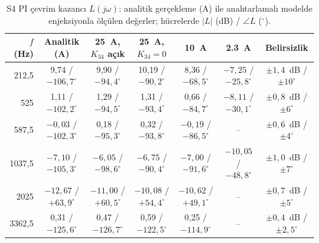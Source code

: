 \begin{table}[htbp]
  \centering
  \caption{S4 PI çevrim kazancı $L(j\omega)$: analitik gerçekleme (A) ile anahtarlamalı modelde enjeksiyonla ölçülen değerler; hücrelerde $|L|$ (dB) / $\angle L$ ($^{\circ}$).}
  \label{tab:kararlilik-olcum}
  \scriptsize
  \setlength{\tabcolsep}{3pt}
  \begin{tabular}{@{}r c c c c c c@{}}
    \toprule
    $f$ (Hz) & Analitik (A) & \SI{25}{\ampere}, $K_{34}$ açık & \SI{25}{\ampere}, $K_{34}=0$ & \SI{10}{\ampere} & \SI{2.3}{\ampere} & Belirsizlik \\
    \midrule
    212,5  & 9,74 / $-106{,}7^{\circ}$ & 9,90 / $-94{,}4^{\circ}$ & 10,19 / $-90{,}2^{\circ}$ & 8,36 / $-68{,}5^{\circ}$ & $-7{,}25$ / $-25{,}8^{\circ}$ & $\pm1{,}4$~dB / $\pm10^{\circ}$ \\
    525    & 1,11 / $-102{,}2^{\circ}$ & 1,29 / $-94{,}5^{\circ}$ & 1,31 / $-93{,}4^{\circ}$ & 0,66 / $-84{,}7^{\circ}$ & $-8{,}11$ / $-30{,}1^{\circ}$ & $\pm0{,}8$~dB / $\pm6^{\circ}$ \\
    587,5  & $-0{,}03$ / $-102{,}3^{\circ}$ & 0,18 / $-95{,}3^{\circ}$ & 0,32 / $-93{,}8^{\circ}$ & $-0{,}19$ / $-86{,}5^{\circ}$ & -- & $\pm0{,}6$~dB / $\pm4^{\circ}$ \\
    1037,5 & $-7{,}10$ / $-105{,}3^{\circ}$ & $-6{,}05$ / $-98{,}6^{\circ}$ & $-6{,}75$ / $-90{,}4^{\circ}$ & $-7{,}00$ / $-91{,}6^{\circ}$ & $-10{,}05$ / $-48{,}8^{\circ}$ & $\pm1{,}0$~dB / $\pm7^{\circ}$ \\
    2025   & $-12{,}67$ / $+63{,}9^{\circ}$ & $-11{,}00$ / $+60{,}5^{\circ}$ & $-10{,}08$ / $+54{,}4^{\circ}$ & $-10{,}62$ / $+49{,}1^{\circ}$ & -- & $\pm0{,}7$~dB / $\pm5^{\circ}$ \\
    3362,5 & 0,31 / $-125{,}6^{\circ}$ & 0,47 / $-126{,}7^{\circ}$ & 0,59 / $-122{,}5^{\circ}$ & 0,25 / $-114{,}9^{\circ}$ & -- & $\pm0{,}4$~dB / $\pm2{,}5^{\circ}$ \\
    \bottomrule
  \end{tabular}
\end{table}

